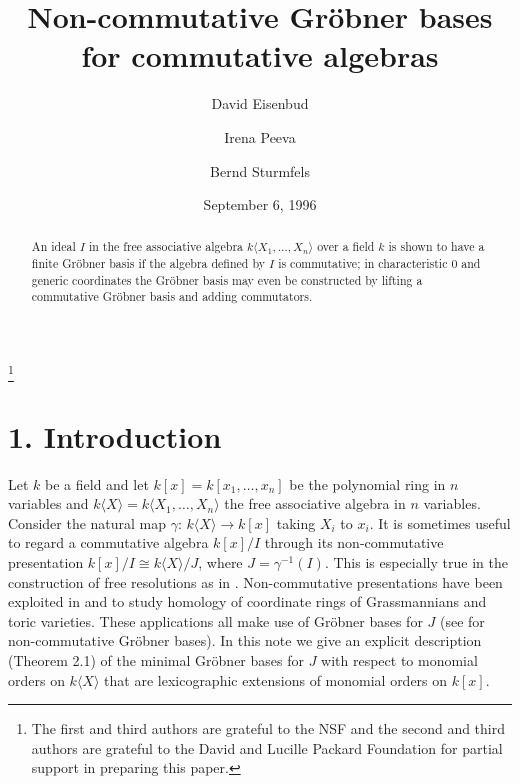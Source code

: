 \documentclass{proc-l}
\theoremstyle{plain}
\theoremstyle{definition}
\begin{document}
\title[Non-commutative Gr\"{o}bner bases for Commutative Algebras]
{Non-commutative Gr\"{o}bner bases \\ for commutative algebras}
\author{David Eisenbud}
\address{MSRI, 1000 Centennial Dr., Berkeley, California 94720}
\author{Irena Peeva}
\address{Department of Mathematics, Massachusetts Institute of Technology,
Cambridge, Massachusetts 02139}
\author{Bernd Sturmfels}
\address{Department of Mathematics, University of California, Berkeley,
California 94720}
\date{September 6, 1996}
\thanks{The first and third authors are grateful to the NSF and
 the second and third authors
are grateful to the David and Lucille Packard Foundation for 
partial support in preparing this paper. }
\begin{abstract} An ideal
$I$ in the free associative algebra  $k\langle X_{1},\dots ,X_{n}\rangle $
over a field $k$
is shown to have a finite Gr\"{o}bner basis if the algebra defined by $I$ is
commutative; in characteristic 0 and generic coordinates the 
Gr\"{o}bner basis may even be constructed by lifting a commutative Gr\"{o}bner
basis and adding commutators.
\end{abstract}
\maketitle



\section*{1. Introduction}

Let $k$ be a field and let 
$k[x] = k[x_{1},\dots ,x_{n}]$ be the polynomial ring in
$n$ variables and $k \langle X \rangle = k\langle X_{1},\dots ,X_{n}\rangle $ 
the free associative algebra in $n$ variables. Consider the
natural map $\gamma :\, k \langle X \rangle \to k[x] $ taking $X_{i}$ to $x_{i}$.
It is sometimes useful to regard a commutative algebra
$k[x]/I$ through its non-commutative presentation 
$k[x]/I \cong k \langle X \rangle /J$, 
where $J = \gamma ^{-1}(I)$. This is especially
true in the construction of free resolutions as in \cite{An}. 
Non-commutative presentations have been exploited in 
\cite{AR} and \cite{PRS} to study homology of 
coordinate rings of Grassmannians and toric varieties.
These applications all make use of Gr\"{o}bner bases for $J$
(see \cite{Mo}  for non-commutative  Gr\"{o}bner bases).
In this note we give an explicit description (Theorem 2.1) of the minimal
Gr\"{o}bner bases for $J$ with respect to monomial orders on
$k \langle X \rangle $ that are lexicographic extensions of
monomial orders on $k [x] $. 
\end{document}
